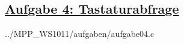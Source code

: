 \subsection*
{\href{http://cst.mi.fu-berlin.de/intern/19606-P-MPP/Aufgaben/040104.html}
{Aufgabe 4: Tastaturabfrage}}


{../MPP_WS1011/aufgaben/aufgabe04.c}

